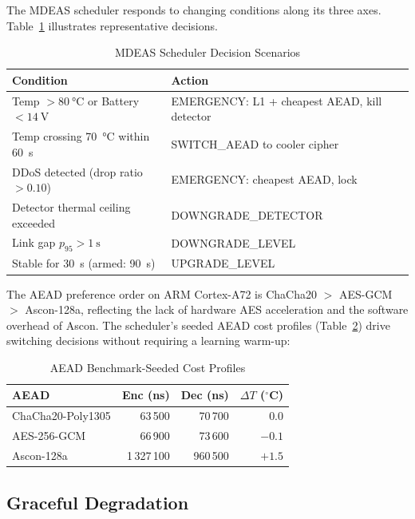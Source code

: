 \documentclass[conference]{IEEEtran}
\begin{document}
The MDEAS scheduler responds to changing conditions along its three axes.
Table~\ref{tab:scheduler-scenarios} illustrates representative decisions.

\begin{table}[t]
\centering
\caption{MDEAS Scheduler Decision Scenarios}
\label{tab:scheduler-scenarios}
\small
\begin{tabular}{@{}p{3.5cm}p{4cm}@{}}
\toprule
\textbf{Condition} & \textbf{Action} \\
\midrule
Temp $> \SI{80}{\celsius}$ or Battery $< \SI{14}{\volt}$ & EMERGENCY: L1 + cheapest AEAD, kill detector \\
Temp crossing \SI{70}{\celsius} within \SI{60}{\second} & SWITCH\_AEAD to cooler cipher \\
DDoS detected (drop ratio $> 0.10$) & EMERGENCY: cheapest AEAD, lock \\
Detector thermal ceiling exceeded & DOWNGRADE\_DETECTOR \\
Link gap $p_{95} > \SI{1}{\second}$ & DOWNGRADE\_LEVEL \\
Stable for \SI{30}{\second} (armed: \SI{90}{\second}) & UPGRADE\_LEVEL \\
\bottomrule
\end{tabular}
\end{table}

The AEAD preference order on ARM Cortex-A72 is ChaCha20 $>$ AES-GCM $>$ Ascon-128a, reflecting the lack of hardware AES acceleration and the software overhead of Ascon.
The scheduler's seeded AEAD cost profiles (Table~\ref{tab:aead-seed}) drive switching decisions without requiring a learning warm-up:

\begin{table}[t]
\centering
\caption{AEAD Benchmark-Seeded Cost Profiles}
\label{tab:aead-seed}
\small
\begin{tabular}{@{}lrrr@{}}
\toprule
\textbf{AEAD} & \textbf{Enc (ns)} & \textbf{Dec (ns)} & $\Delta T$ ($^\circ$C) \\
\midrule
ChaCha20-Poly1305 & 63\,500 & 70\,700 & 0.0 \\
AES-256-GCM & 66\,900 & 73\,600 & $-0.1$ \\
Ascon-128a & 1\,327\,100 & 960\,500 & $+1.5$ \\
\bottomrule
\end{tabular}
\end{table}

\subsection{Graceful Degradation}
\end{document}

